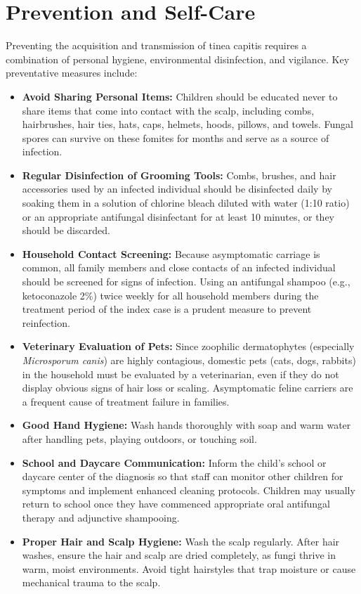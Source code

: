\section*{Prevention and Self-Care}
Preventing the acquisition and transmission of tinea capitis requires a combination of personal hygiene, environmental disinfection, and vigilance. Key preventative measures include:
\begin{itemize}
    \item \textbf{Avoid Sharing Personal Items:} Children should be educated never to share items that come into contact with the scalp, including combs, hairbrushes, hair ties, hats, caps, helmets, hoods, pillows, and towels. Fungal spores can survive on these fomites for months and serve as a source of infection.
    \item \textbf{Regular Disinfection of Grooming Tools:} Combs, brushes, and hair accessories used by an infected individual should be disinfected daily by soaking them in a solution of chlorine bleach diluted with water (1:10 ratio) or an appropriate antifungal disinfectant for at least 10 minutes, or they should be discarded.
    \item \textbf{Household Contact Screening:} Because asymptomatic carriage is common, all family members and close contacts of an infected individual should be screened for signs of infection. Using an antifungal shampoo (e.g., ketoconazole 2\%) twice weekly for all household members during the treatment period of the index case is a prudent measure to prevent reinfection.
    \item \textbf{Veterinary Evaluation of Pets:} Since zoophilic dermatophytes (especially \textit{Microsporum canis}) are highly contagious, domestic pets (cats, dogs, rabbits) in the household must be evaluated by a veterinarian, even if they do not display obvious signs of hair loss or scaling. Asymptomatic feline carriers are a frequent cause of treatment failure in families.
    \item \textbf{Good Hand Hygiene:} Wash hands thoroughly with soap and warm water after handling pets, playing outdoors, or touching soil.
    \item \textbf{School and Daycare Communication:} Inform the child's school or daycare center of the diagnosis so that staff can monitor other children for symptoms and implement enhanced cleaning protocols. Children may usually return to school once they have commenced appropriate oral antifungal therapy and adjunctive shampooing.
    \item \textbf{Proper Hair and Scalp Hygiene:} Wash the scalp regularly. After hair washes, ensure the hair and scalp are dried completely, as fungi thrive in warm, moist environments. Avoid tight hairstyles that trap moisture or cause mechanical trauma to the scalp.
\end{itemize}

